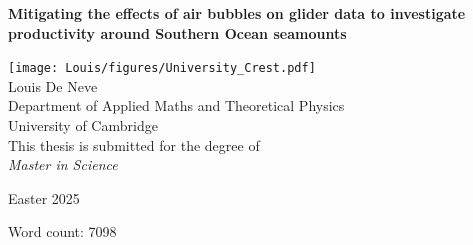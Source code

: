 \documentclass[
	a4paper, %
	10pt, %
	unnumberedsections, %
	twoside, %
]{LTJournalArticle}
\begin{document}

\begin{titlepage}
    \begin{center}
        \vspace*{2cm}
		
        \Huge
        \textbf{Mitigating the effects of air bubbles on glider data to investigate productivity around Southern Ocean seamounts}

        
		\vspace{3cm}

		\noindent
		\texttt{[image: Louis/figures/University\_Crest.pdf]}
		\vspace{2cm}
		\Huge
        \\Louis De Neve\\
		\vspace{0.7cm}
		\Large
		Department of Applied Maths and Theoretical Physics\\
		University of Cambridge\\
		\vfill
        This thesis is submitted for the degree of\\
		\huge
        \textit{Master in Science\\}
		
        
		\huge
		\vspace{2cm}
        Easter 2025

		\large
		\vspace{0.5cm}
		Word count: 7098

		
		
    \end{center}
\end{titlepage}
\end{document}

